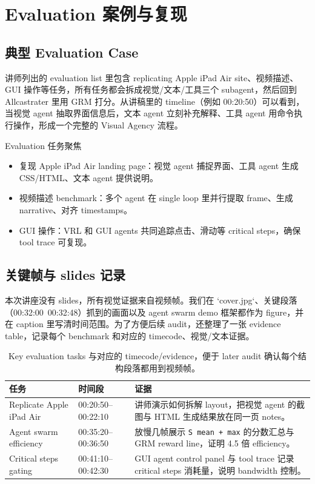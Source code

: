 \section{Evaluation 案例与复现}

\subsection{典型 Evaluation Case}
讲师列出的 evaluation list 里包含 replicating Apple iPad Air site、视频描述、GUI 操作等任务，所有任务都会拆成视觉/文本/工具三个 subagent，然后回到 Allcastrater 里用 GRM 打分。从讲稿里的 timeline（例如 00:20:50）可以看到，当视觉 agent 抽取界面信息后，文本 agent 立刻补充解释、工具 agent 用命令执行操作，形成一个完整的 Visual Agency 流程。

\begin{knowledgebox}{Evaluation 任务聚焦}
\begin{itemize}
    \item 复现 Apple iPad Air landing page：视觉 agent 捕捉界面、工具 agent 生成 CSS/HTML、文本 agent 提供说明。
    \item 视频描述 benchmark：多个 agent 在 single loop 里并行提取 frame、生成 narrative、对齐 timestamps。
    \item GUI 操作：VRL 和 GUI agents 共同追踪点击、滑动等 critical steps，确保 tool trace 可复现。
\end{itemize}
\end{knowledgebox}

\subsection{关键帧与 slides 记录}
本次讲座没有 slides，所有视觉证据来自视频帧。我们在 `cover.jpg`、关键段落（00:32:00~00:32:48）抓到的画面以及 agent swarm demo 框架都作为 figure，并在 caption 里写清时间范围。为了方便后续 audit，还整理了一张 evidence table，记录每个 benchmark 和对应的 timecode、视觉/文本证据。

\begin{table}[H]
\footnotesize
\centering
\begin{tabular}{p{3cm}p{4cm}p{5cm}}
\toprule
任务 & 时间段 & 证据 \\
\midrule
Replicate Apple iPad Air & 00:20:50--00:22:10 & 讲师演示如何拆解 layout，把视觉 agent 的截图与 HTML 生成结果放在同一页 notes。 \\
Agent swarm efficiency & 00:35:20--00:36:50 & 放慢几帧展示 \texttt{S mean + max} 的分数汇总与 GRM reward line，证明 4.5 倍 efficiency。 \\
Critical steps gating & 00:41:10--00:42:30 & GUI agent control panel 与 tool trace 记录 critical steps 消耗量，说明 bandwidth 控制。 \\
\bottomrule
\end{tabular}
\caption{Key evaluation tasks 与对应的 timecode/evidence，便于 later audit 确认每个结构段落都用到视频帧。}
\end{table}

